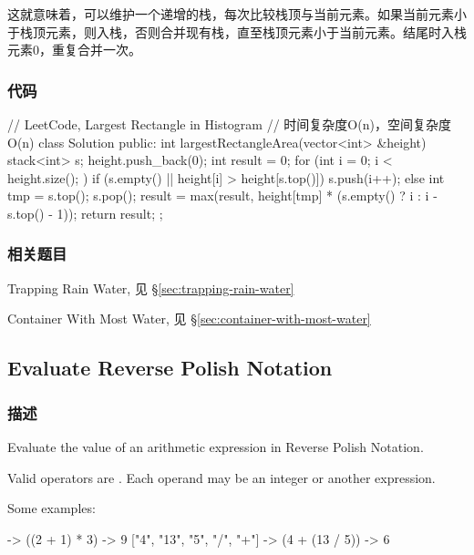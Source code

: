 这就意味着，可以维护一个递增的栈，每次比较栈顶与当前元素。如果当前元素小于栈顶元素，则入栈，否则合并现有栈，直至栈顶元素小于当前元素。结尾时入栈元素0，重复合并一次。


\subsubsection{代码}
\begin{Code}
// LeetCode, Largest Rectangle in Histogram
// 时间复杂度O(n)，空间复杂度O(n)
class Solution {
public:
    int largestRectangleArea(vector<int> &height) {
        stack<int> s;
        height.push_back(0);
        int result = 0;
        for (int i = 0; i < height.size(); ) {
            if (s.empty() || height[i] > height[s.top()])
                s.push(i++);
            else {
                int tmp = s.top();
                s.pop();
                result = max(result,
                        height[tmp] * (s.empty() ? i : i - s.top() - 1));
            }
        }
        return result;
    }
};
\end{Code}


\subsubsection{相关题目}
\begindot
\item Trapping Rain Water, 见 \S \ref{sec:trapping-rain-water}
\item Container With Most Water, 见 \S \ref{sec:container-with-most-water}
\myenddot


\subsection{Evaluate Reverse Polish Notation} %
\label{sec:Evaluate-Reverse-Polish-Notation}


\subsubsection{描述}
Evaluate the value of an arithmetic expression in Reverse Polish Notation.

Valid operators are \fn{+, -, *, /}. Each operand may be an integer or another expression.

Some examples:
\begin{Code}
  ["2", "1", "+", "3", "*"] -> ((2 + 1) * 3) -> 9
  ["4", "13", "5", "/", "+"] -> (4 + (13 / 5)) -> 6
\end{Code}


